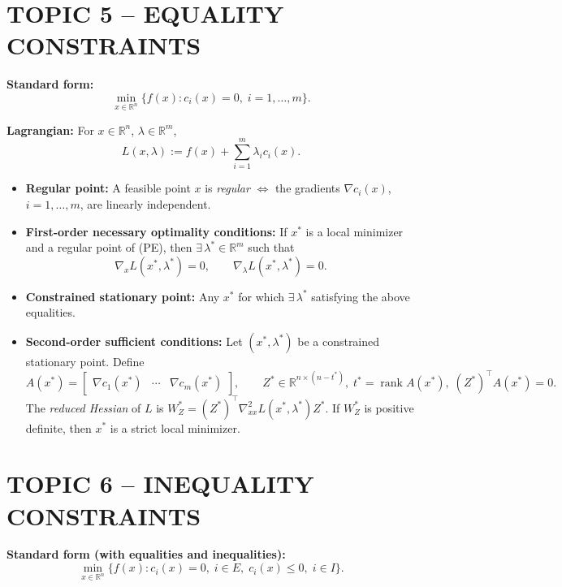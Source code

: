 \documentclass[12pt]{article}
\begin{document}
\section*{TOPIC 5 -- EQUALITY CONSTRAINTS}

\textbf{Standard form:}
\begin{equation*}
  \min_{x\in\mathbb{R}^n} \bigl\{ f(x) : c_i(x)=0,\; i=1,\ldots,m \bigr\}. \tag{PE}
\end{equation*}

\textbf{Lagrangian:} For $x\in\mathbb{R}^n$, $\lambda\in\mathbb{R}^m$,
\[
  L(x,\lambda) := f(x) + \sum_{i=1}^m \lambda_i c_i(x).
\]

\begin{itemize}
  \item \textbf{Regular point:} A feasible point $x$ is \emph{regular} $\Leftrightarrow$ the gradients $\nabla c_i(x)$, $i=1,\ldots,m$, are linearly independent.
  \item \textbf{First-order necessary optimality conditions:} If $x^*$ is a local minimizer and a regular point of (PE), then $\exists\,\lambda^*\in\mathbb{R}^m$ such that
  \[
    \nabla_x L(x^*,\lambda^*) = 0, \qquad \nabla_{\lambda} L(x^*,\lambda^*) = 0.
  \]
  \item \textbf{Constrained stationary point:} Any $x^*$ for which $\exists\,\lambda^*$ satisfying the above equalities.
  \item \textbf{Second-order sufficient conditions:} Let $(x^*,\lambda^*)$ be a constrained stationary point. Define
  \[
    A(x^*) = \begin{bmatrix} \nabla c_1(x^*) & \cdots & \nabla c_m(x^*) \end{bmatrix}, \qquad
    Z^* \in \mathbb{R}^{n\times(n-t^*)}, \; t^*=\operatorname{rank}A(x^*), \; (Z^*)^{\top}A(x^*) = 0.
  \]
  The \emph{reduced Hessian} of $L$ is $W_Z^* = (Z^*)^{\top}\nabla_{xx}^2 L(x^*,\lambda^*) Z^*$. If $W_Z^*$ is positive definite, then $x^*$ is a strict local minimizer.
\end{itemize}

\bigskip
\section*{TOPIC 6 -- INEQUALITY CONSTRAINTS}

\textbf{Standard form (with equalities and inequalities):}
\begin{equation*}
  \min_{x\in\mathbb{R}^n} \bigl\{ f(x) : c_i(x)=0,\; i\in E,\; c_i(x)\le 0,\; i\in I \bigr\}. \tag{NLP}
\end{equation*}
\end{document}
